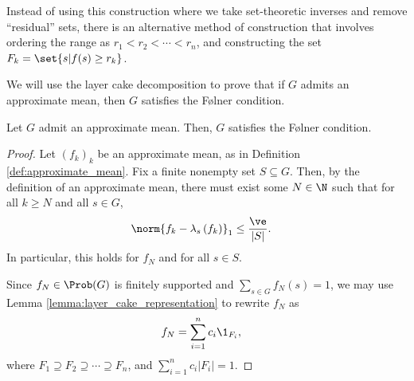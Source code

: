 \begin{remark}
  Instead of using this construction where we take set-theoretic inverses and remove ``residual'' sets, there is an alternative method of construction that involves ordering the range as $r_1 < r_2< \cdots < r_n$, and constructing the set $F_k = \set{s | f(s) \geq r_k}$.
\end{remark}


We will use the layer cake decomposition to prove that if $G$ admits an approximate mean, then $G$ satisfies the Følner condition.
\begin{proposition}\label{prop:approx_mean_implies_folner}
  Let $G$ admit an approximate mean. Then, $G$ satisfies the Følner condition.
\end{proposition}
\begin{proof}
  Let $\left(f_k\right)_k$ be an approximate mean, as in Definition \ref{def:approximate_mean}. Fix a finite nonempty set $S \subseteq G$. Then, by the definition of an approximate mean, there must exist some $N\in\N$ such that for all $k\geq N$ and all $s\in G$,
  \begin{align*}
    \norm{f_k - \lambda_s\left(f_k\right)}_{1} &\leq \frac{\ve}{|S|}.
  \end{align*}
  In particular, this holds for $f_N$ and for all $s\in S$.\newline

  Since $f_N\in \Prob(G)$ is finitely supported and $\sum_{s\in G}f_N(s) = 1$, we may use Lemma \ref{lemma:layer_cake_representation} to rewrite $f_N$ as
  \begin{align*}
    f_N &= \sum_{i=1}^{n}c_i\1_{F_i},
  \end{align*}
  where $F_1 \supseteq F_2\supseteq \cdots \supseteq F_n$, and $\sum_{i=1}^{n}c_i\left\vert F_i \right\vert = 1$.\newline


\end{proof}
